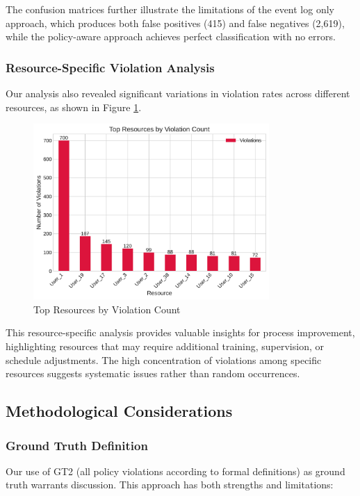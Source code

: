 The confusion matrices further illustrate the limitations of the event log only approach, which produces both false positives (415) and false negatives (2,619), while the policy-aware approach achieves perfect classification with no errors.

\subsubsection{Resource-Specific Violation Analysis}

Our analysis also revealed significant variations in violation rates across different resources, as shown in Figure \ref{fig:resource-violations}.

\begin{figure}[h]
\centering
\includegraphics[width=0.8\textwidth]{paper_sections/violations_by_resource.pdf}
\caption{Top Resources by Violation Count}
\label{fig:resource-violations}
\end{figure}

This resource-specific analysis provides valuable insights for process improvement, highlighting resources that may require additional training, supervision, or schedule adjustments. The high concentration of violations among specific resources suggests systematic issues rather than random occurrences.

\subsection{Methodological Considerations}

\subsubsection{Ground Truth Definition}
Our use of GT2 (all policy violations according to formal definitions) as ground truth warrants discussion. This approach has both strengths and limitations:

